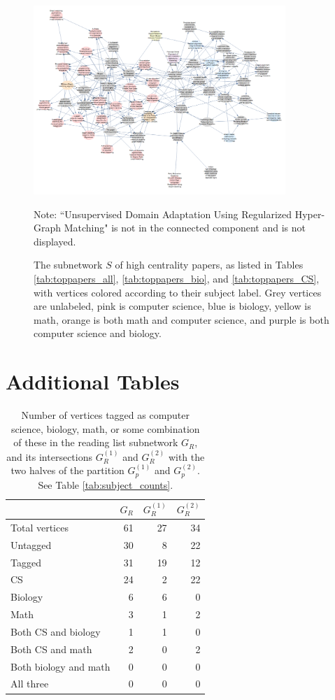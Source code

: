 \documentclass[12pt]{thesis}
\theoremstyle{plain}
\theoremstyle{definition}
\theoremstyle{remark}
\begin{document}
{\begin{figure}
\centering
\includegraphics[width=0.85\textwidth]{reading_list_subject_colored_CROPPED.png}
\caption{The subnetwork $S$ of high centrality papers, as listed in Tables \ref{tab:toppapers_all}, \ref{tab:toppapers_bio}, and \ref{tab:toppapers_CS}, with vertices colored according to their subject label. Grey vertices are unlabeled, pink is computer science, blue is biology, yellow is math, orange is both math and computer science, and purple is both computer science and biology.}
\vspace{-12pt}\flushleft\scriptsize Note: ``Unsupervised Domain Adaptation Using Regularized Hyper-Graph Matching" is not in the connected component and is not displayed.
\label{fig:reading_list_subject_colored}
\end{figure}


\section{Additional Tables}

\begin{table}[t]
\centering
\begin{tabular}{|l|r|r|r|}
\hline & $G_R$ & $G_R^{(1)}$ & $G_R^{(2)}$ \\ \hline
Total vertices & 61 & 27 & 34 \\ \hline
Untagged & 30 & 8 & 22 \\ \hline
Tagged & 31 & 19 & 12 \\ \hline
CS & 24 & 2 & 22 \\ \hline
Biology & 6 & 6 & 0 \\ \hline
Math & 3 & 1 & 2 \\ \hline
Both CS and biology & 1 & 1 & 0 \\ \hline
Both CS and math & 2 & 0 & 2 \\ \hline
Both biology and math & 0 & 0 & 0 \\ \hline
All three & 0 & 0 & 0 \\ \hline
\end{tabular}
\caption{Number of vertices tagged as computer science, biology, math, or some combination of these in the reading list subnetwork $G_R$, and its intersections $G_R^{(1)}$ and $G_R^{(2)}$ with the two halves of the partition $G_p^{(1)}$ and $G_p^{(2)}$. See Table \ref{tab:subject_counts}.}
\label{tab:reading_list_subject_counts}
\end{table}

}
\end{document}
